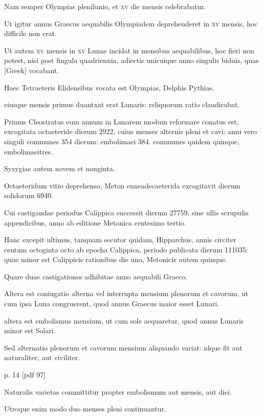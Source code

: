 Nam semper Olympias plenilunio, et \textsc{xv}
die mensis celebrabatur.

Ut igitur annus Graecus aequabilis Olympiadem
deprehenderet in \textsc{xv} mensis, hoc difficile non erat.

Ut autem
\textsc{xv} mensis in \textsc{xv}
 Lunae incidat in mensibus aequabilibus, hoc fieri non
potest, nisi post fingula quadriennia, adiectis unicuique anno singulis
biduis, quas \textgreek{[Greek]} vocabant.

Haec Tetraeteris Elidensibus
vocata est Olympias, Delphis Pythias.

eiusque mensis primus duantxat
erat Lunaris: reliquorum ratio claudicabat.

Primus Cleostratus
eum annum in Lunarem modum reformare conatus est, excogitata
octaeteride dierum 2922, cuius menses alternis pleni et cavi: anni vero
singuli communes 354 dierum: embolimaei 384. communes quidem
quinque, embolimaeitres.

Syzygiae autem novem et nonginta.

Octaeteridum
vitio deprehenso, Meton enneadecaeterida excogitavit dierum
solidorum 6940.

Cui castigandae periodus Calippica successit dierum
27759, sine ullis scrupulis appendicibus, anno ab editione Metonica
centesimo tertio.

Hanc excepit ultimus, tanquam secutor quidam,
Hipparchus, annis circiter centum octoginta octo ab epocha Calippica,
periodo publicata dierum 111035: quae minor est Calippicis rationibus
die uno, Metonicis autem quinque.

Quare duae castigationes adhibitae
anno aequabili Graeco.

Altera est coniugatio alterna vel interrupta
mensium plenorum et cavorum, ut cum ipsa Luna congruerent, quod
annus Graecus maior esset Lunari.

altera est embolismus mensium, ut
cum sole aequaretur, quod annus Lunaris minor est Solari.

Sed alternatio
plenorum et cavorum mensium aliquando variat: idque fit aut
naturaliter, aut civiliter.


p. 14 [pdf 97]

Naturalis varietas committitur propter embolismum
aut mensis, aut diei.

Utroque enim modo duo menses pleni continuantur.

